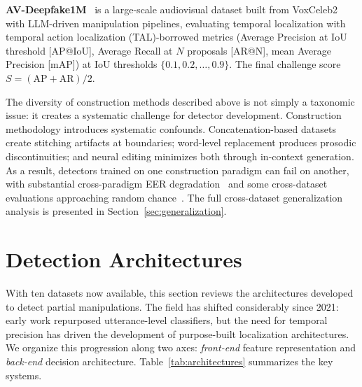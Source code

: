 \documentclass[journal]{IEEEtran}
\begin{document}
\textbf{AV-Deepfake1M}~\cite{cai2024avdeepfake1m} is a large-scale audiovisual dataset built from VoxCeleb2~\cite{chung2018voxceleb2} with LLM-driven manipulation pipelines, evaluating temporal localization with temporal action localization (TAL)-borrowed metrics (Average Precision at IoU threshold [AP@IoU], Average Recall at $N$ proposals [AR@N], mean Average Precision [mAP]) at IoU thresholds $\{0.1, 0.2, \ldots, 0.9\}$. The final challenge score $S = (\text{AP} + \text{AR})/2$.

The diversity of construction methods described above is not simply a taxonomic issue: it creates a systematic challenge for detector development. Construction methodology introduces systematic confounds. Concatenation-based datasets create stitching artifacts at boundaries; word-level replacement produces prosodic discontinuities; and neural editing minimizes both through in-context generation. As a result, detectors trained on one construction paradigm can fail on another, with substantial cross-paradigm EER degradation~\cite{zhang2025partialedit} and some cross-dataset evaluations approaching random chance~\cite{li2025hqmpsd}. The full cross-dataset generalization analysis is presented in Section~\ref{sec:generalization}.


\section{Detection Architectures}
\label{sec:detection}

With ten datasets now available, this section reviews the architectures developed to detect partial manipulations. The field has shifted considerably since 2021: early work repurposed utterance-level classifiers, but the need for temporal precision has driven the development of purpose-built localization architectures. We organize this progression along two axes: \emph{front-end} feature representation and \emph{back-end} decision architecture. Table~\ref{tab:architectures} summarizes the key systems.
\end{document}
